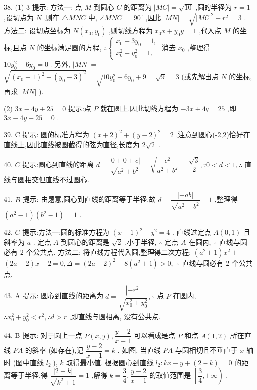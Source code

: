 38. (1) 3 提示: 方法一: 点 $M$ 到圆心 $C$ 的距离为 $\left| {MC}\right|  = \sqrt{10}$ ,圆的半径为 $r = 1$ ,设切点为 $N$ ,则在 $\bigtriangleup {MNC}$ 中, $\angle {MNC} =$  ${90}^{ \circ  }$ ,因此 $\left| {MN}\right|  = \sqrt{{\left| MC\right| }^{2} - {r}^{2}} = 3$ . 方法二: 设切点坐标为 $N\left( {{x}_{0},{y}_{0}}\right)$ ,则切线方程为 ${x}_{0}x + {y}_{0}y = 1$ ,代入点 $M$ 的坐标,且点 $N$ 的坐标满足圆的方程, $\therefore \left\{  \begin{array}{l} {x}_{0} + 3{y}_{0} = 1, \\  {x}_{0}^{2} + {y}_{0}^{2} = 1, \end{array}\right.$ 消去 ${x}_{0}$ ,整理得 ${10}{y}_{0}^{2} - 6{y}_{0} = 0$ . 另外, $\left| {MN}\right|  =$  $\sqrt{{\left( {x}_{0} - 1\right) }^{2} + {\left( {y}_{0} - 3\right) }^{2}} = \sqrt{{10}{y}_{0}^{2} - 6{y}_{0} + 9} = \sqrt{9} = 3$ (或先解出点 $N$ 的坐标,再求 $\left| {MN}\right|$ ).

(2) ${3x} - {4y} + {25} = 0$ 提示:点 $P$ 就在圆上,因此切线方程为 $- {3x} + {4y} = {25}$ ,即 ${3x} - {4y} + {25} = 0$ .

39. C 提示: 圆的标准方程为 ${\left( x + 2\right) }^{2} + {\left( y - 2\right) }^{2} = 2$ ,注意到圆心(-2,2)恰好在直线上,因此直线被圆截得的弦为直径,长度为 $2\sqrt{2}$ .

40. $C$ 提示:圆心到直线的距离 $d = \dfrac{\left| 0 + 0 + c\right| }{\sqrt{{a}^{2} + {b}^{2}}} = \sqrt{\dfrac{{c}^{2}}{{a}^{2} + {b}^{2}}} = \dfrac{\sqrt{3}}{2},\because 0 < d < 1,\therefore$ 直线与圆相交但直线不过圆心.

41. $B$ 提示: 由题意,圆心到直线的距离等于半径,故 $d = \dfrac{\left| -ab\right| }{\sqrt{{a}^{2} + {b}^{2}}} = 1$ ,整理得 $\left( {{a}^{2} - 1}\right) \left( {{b}^{2} - 1}\right)  = 1$ .

42. $C$ 提示:方法一:圆的标准方程为 ${\left( x - 1\right) }^{2} + {y}^{2} = 4$ . 直线过定点 $A\left( {0,1}\right)$ 且斜率为 $a$ . 定点 $A$ 到圆心的距离是 $\sqrt{2}$ ,小于半径, $\therefore$ 定点 $A$ 在圆内, $\therefore$ 直线与圆必有 2 个公共点. 方法二: 将直线方程代入圆,整理得二次方程: $\left( {{a}^{2} + 1}\right) {x}^{2} +$  $\left( {{2a} - 2}\right) x - 2 = 0,\Delta  = {\left( {2a} - 2\right) }^{2} + 8\left( {{a}^{2} + 1}\right)  > 0,\;\therefore$ 直线与圆必有 2 个公共点.

43. A 提示: 圆心到直线的距离为 $d = \dfrac{\left| -{r}^{2}\right| }{\sqrt{{x}_{0}^{2} + {y}_{0}^{2}}},\because$ 点 $P$ 在圆内, $\therefore {x}_{0}^{2} + {y}_{0}^{2} < {r}^{2},\therefore d > r$ ,即直线与圆相离, 没有公共点.

44. B 提示: 对于圆上一点 $P\left( {x,y}\right) ,\dfrac{y - 2}{x - 1}$ 可以看成是点 $P$ 和点 $A\left( {1,2}\right)$ 所在直线 ${PA}$ 的斜率 (如存在),记 $\dfrac{y - 2}{x - 1} = k$ . 如图, 当直线 ${PA}$ 与圆相切且不垂直于 $x$ 轴时 (图中直线 ${l}_{2}$ ), $k$ 取得最小值. 根据圆心到直线 ${l}_{2} : {kx} - y + \left( {2 - k}\right)  = 0$ 的距离等于半径,得 $\dfrac{\left| 2 - k\right| }{\sqrt{{k}^{2} + 1}} = 1$ ,解得 $k = \dfrac{3}{4},\dfrac{y - 2}{x - 1}$ 的取值范围是 $\left\lbrack  {\dfrac{3}{4}, + \infty }\right)$ .

